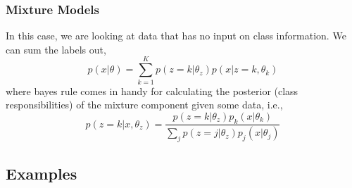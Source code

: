\documentclass[11pt]{article}
\begin{document}
\subsubsection{Mixture Models}
In this case, we are looking at data that has no input on class information. We can sum the labels out,
\begin{equation*}
    p(x | \theta)=\sum_{k=1}^{K} p\left(z=k | \theta_{z}\right) p\left(x | z=k, \theta_{k}\right)
\end{equation*}
where bayes rule comes in handy for calculating the posterior (class responsibilities) of the mixture component given some data, i.e., 
\begin{equation*}
    p\left(z=k | x, \theta_{z}\right)=\frac{p\left(z=k | \theta_{z}\right) p_{k}\left(x | \theta_{k}\right)}{\sum_{j} p\left(z=j | \theta_{z}\right) p_{j}\left(x | \theta_{j}\right)}
\end{equation*} 
%

\subsection{Examples}
\end{document}
